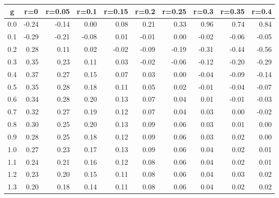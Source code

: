 %
\begin{table}[!tbp]
 \begin{center}
 \begin{tabular}{rrrrrrrrrr}\hline\hline
\multicolumn{1}{c}{g}&\multicolumn{1}{c}{r=0}&\multicolumn{1}{c}{r=0.05}&\multicolumn{1}{c}{r=0.1}&\multicolumn{1}{c}{r=0.15}&\multicolumn{1}{c}{r=0.2}&\multicolumn{1}{c}{r=0.25}&\multicolumn{1}{c}{r=0.3}&\multicolumn{1}{c}{r=0.35}&\multicolumn{1}{c}{r=0.4}\tabularnewline
\hline
0.0&-0.24&-0.14& 0.00& 0.08& 0.21& 0.33& 0.96& 0.74& 0.84\tabularnewline
0.1&-0.29&-0.21&-0.08& 0.01&-0.01& 0.00&-0.02&-0.06&-0.05\tabularnewline
0.2& 0.28& 0.11& 0.02&-0.02&-0.09&-0.19&-0.31&-0.44&-0.56\tabularnewline
0.3& 0.35& 0.23& 0.11& 0.03&-0.02&-0.06&-0.12&-0.20&-0.29\tabularnewline
0.4& 0.37& 0.27& 0.15& 0.07& 0.03& 0.00&-0.04&-0.09&-0.14\tabularnewline
0.5& 0.35& 0.28& 0.18& 0.11& 0.05& 0.02&-0.01&-0.04&-0.07\tabularnewline
0.6& 0.34& 0.28& 0.20& 0.13& 0.07& 0.04& 0.01&-0.01&-0.03\tabularnewline
0.7& 0.32& 0.27& 0.19& 0.12& 0.07& 0.04& 0.03& 0.00&-0.02\tabularnewline
0.8& 0.30& 0.25& 0.20& 0.13& 0.09& 0.06& 0.03& 0.01& 0.00\tabularnewline
0.9& 0.28& 0.25& 0.18& 0.12& 0.09& 0.06& 0.03& 0.02& 0.00\tabularnewline
1.0& 0.27& 0.23& 0.17& 0.13& 0.09& 0.06& 0.04& 0.02& 0.01\tabularnewline
1.1& 0.24& 0.21& 0.16& 0.12& 0.08& 0.06& 0.04& 0.02& 0.01\tabularnewline
1.2& 0.23& 0.20& 0.15& 0.11& 0.08& 0.06& 0.04& 0.03& 0.02\tabularnewline
1.3& 0.20& 0.18& 0.14& 0.11& 0.08& 0.06& 0.04& 0.02& 0.02\tabularnewline
\hline
\end{tabular}

\end{center}

\end{table}

